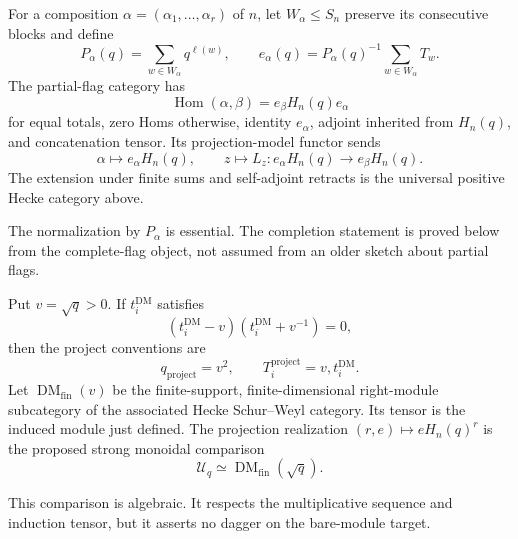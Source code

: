 \begin{definition}
For a composition $\alpha=(\alpha_1,\ldots,\alpha_r)$ of $n$, let
$W_\alpha\leq S_n$ preserve its consecutive blocks and define
\[
 P_\alpha(q)=\sum_{w\in W_\alpha}q^{\ell(w)},\qquad
 e_\alpha(q)=P_\alpha(q)^{-1}\sum_{w\in W_\alpha}T_w.
\]
The partial-flag category has
\[
 \operatorname{Hom}(\alpha,\beta)=e_\beta H_n(q)e_\alpha
\]
for equal totals, zero Homs otherwise, identity $e_\alpha$, adjoint inherited
from $H_n(q)$, and concatenation tensor.  Its projection-model functor sends
\[
 \alpha\longmapsto e_\alpha H_n(q),\qquad
 z\longmapsto L_z:e_\alpha H_n(q)\to e_\beta H_n(q).
\]
The extension under finite sums and self-adjoint retracts is the universal
positive Hecke category above.
\end{definition}
\begin{scope}
The normalization by $P_\alpha$ is essential.  The completion statement is
proved below from the complete-flag object, not assumed from an older sketch
about partial flags.
\end{scope}

\begin{definition}
Put $v=\sqrt q>0$.  If $t_i^{\mathrm{DM}}$ satisfies
\[
 (t_i^{\mathrm{DM}}-v)(t_i^{\mathrm{DM}}+v^{-1})=0,
\]
then the project conventions are
\[
 q_{\mathrm{project}}=v^2,
 \qquad T_i^{\mathrm{project}}=v,t_i^{\mathrm{DM}}.
\]
Let $\operatorname{DM}_{\mathrm{fin}}(v)$ be the finite-support,
finite-dimensional right-module subcategory of the associated Hecke
Schur--Weyl category.  Its tensor is the induced module just defined.  The
projection realization $(r,e)\mapsto eH_n(q)^r$ is the proposed strong
monoidal comparison
\[
 \mathcal U_q\simeq\operatorname{DM}_{\mathrm{fin}}(\sqrt q).
\]
\end{definition}
\begin{scope}
This comparison is algebraic.  It respects the multiplicative sequence and
induction tensor, but it asserts no dagger on the bare-module target.
\end{scope}

